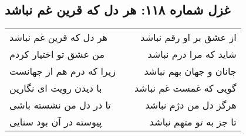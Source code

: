 \begin{center}
\section*{غزل شماره ۱۱۸: هر دل که قرین غم نباشد}
\label{sec:118}
\begin{longtable}{l p{0.5cm} r}
هر دل که قرین غم نباشد
&&
از عشق بر او رقم نباشد
\\
من عشق تو اختیار کردم
&&
شاید که مرا درم نباشد
\\
زیرا که درم هم از جهانست
&&
جانان و جهان بهم نباشد
\\
با دیدن رویت ای نگارین
&&
گویی که غمست غم نباشد
\\
تا در دل من نشسته باشی
&&
هرگز دل من دژم نباشد
\\
پیوسته در آن بود سنایی
&&
تا جز به تو متهم نباشد
\\
\end{longtable}
\end{center}
